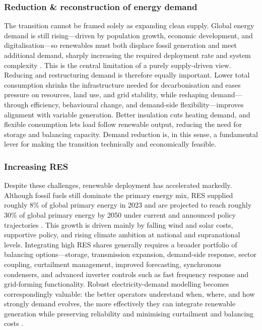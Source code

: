 \subsubsection*{Reduction \& reconstruction of energy demand}
The transition cannot be framed solely as expanding clean supply. Global energy demand is still rising—driven by population growth, economic development, and digitalisation—so renewables must both displace fossil generation and meet additional demand, sharply increasing the required deployment rate and system complexity \cite{ritchieEnergyMix2020}. This is the central limitation of a purely supply-driven view.
\newline Reducing and restructuring demand is therefore equally important. Lower total consumption shrinks the infrastructure needed for decarbonisation and eases pressure on resources, land use, and grid stability, while reshaping demand—through efficiency, behavioural change, and demand-side flexibility—improves alignment with variable generation. Better insulation cuts heating demand, and flexible consumption lets load follow renewable output, reducing the need for storage and balancing capacity. Demand reduction is, in this sense, a fundamental lever for making the transition technically and economically feasible.

\subsubsection*{Increasing RES}
Despite these challenges, renewable deployment has accelerated markedly. Although fossil fuels still dominate the primary energy mix, RES supplied roughly 8\% of global primary energy in 2023 and are projected to reach roughly 30\% of global primary energy by 2050 under current and announced policy trajectories \cite{iea2025weo}. This growth is driven mainly by falling wind and solar costs, supportive policy, and rising climate ambition at national and supranational levels.
\newline Integrating high RES shares generally requires a broader portfolio of balancing options—storage, transmission expansion, demand-side response, sector coupling, curtailment management, improved forecasting, synchronous condensers, and advanced inverter controls such as fast frequency response and grid-forming functionality. Robust electricity-demand modelling becomes correspondingly valuable: the better operators understand when, where, and how strongly demand evolves, the more effectively they can integrate renewable generation while preserving reliability and minimising curtailment and balancing costs \cite{entsoe_flexibility_res_2025, iea_value_demand_flexibility_2025}.

